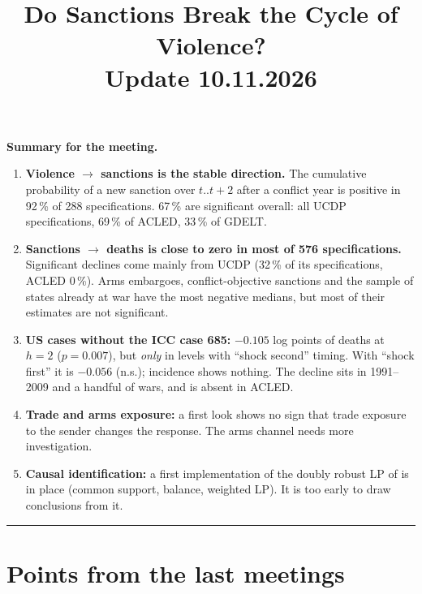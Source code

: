 \documentclass[11pt,a4paper]{article}
\title{Do Sanctions Break the Cycle of Violence?\\[4pt]
\normalsize Update 10.11.2026}
\author{}
\date{}
\newcommand{\parttitle}[1]{\vspace{1.2em}\noindent{\Large\bfseries #1}\par\vspace{0.3em}\hrule\vspace{0.6em}}
\begin{document}
\maketitle
\onehalfspacing

\begin{mdframed}[linewidth=0.6pt,innerleftmargin=10pt,innerrightmargin=10pt]
\textbf{Summary for the meeting.}
\begin{enumerate}[leftmargin=*]
\item \textbf{Violence $\rightarrow$ sanctions is the stable direction.} The cumulative probability of a new sanction
  over $t..t+2$ after a conflict year is positive in 92\,\% of 288 specifications. 67\,\% are significant overall: all
  UCDP specifications, 69\,\% of ACLED, 33\,\% of GDELT.
\item \textbf{Sanctions $\rightarrow$ deaths is close to zero in most of 576 specifications.} Significant declines
  come mainly from UCDP (32\,\% of its specifications, ACLED 0\,\%). Arms embargoes, conflict-objective sanctions
  and the sample of states already at war have the most negative medians, but most of their estimates are not
  significant.
\item \textbf{US cases without the ICC case 685:} $-0.105$ log points of deaths at $h=2$ ($p=0.007$), but
  \emph{only} in levels with ``shock second'' timing. With ``shock first'' it is $-0.056$ (n.s.); incidence shows nothing.
  The decline sits in 1991--2009 and a handful of wars, and is absent in ACLED.
\item \textbf{Trade and arms exposure:} a first look shows no sign that trade exposure to the sender changes the
  response. The arms channel needs more investigation.
\item \textbf{Causal identification:} a first implementation of the doubly robust LP of \citet{jordataylor2016}
  is in place (common support, balance, weighted LP). It is too early to draw conclusions from it.
\end{enumerate}
\end{mdframed}

\newpage
\parttitle{Part A --- Results}

\section{Points from the last meetings}
\end{document}
